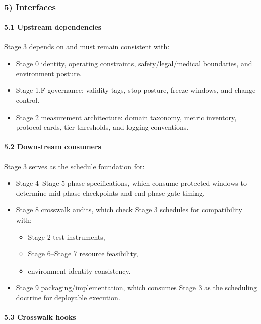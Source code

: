 \documentclass[10pt]{article}
\begin{document}
\subsubsection*{5) Interfaces}

\paragraph*{5.1 Upstream dependencies}

Stage 3 depends on and must remain consistent with:

\begin{itemize}
\item Stage 0 identity, operating constraints, safety/legal/medical boundaries, and environment posture.
\item Stage 1.F governance: validity tags, stop posture, freeze windows, and change control.
\item Stage 2 measurement architecture: domain taxonomy, metric inventory, protocol cards, tier thresholds, and logging conventions.
\end{itemize}

\paragraph*{5.2 Downstream consumers}

Stage 3 serves as the schedule foundation for:

\begin{itemize}
\item Stage 4–Stage 5 phase specifications, which consume protected windows to determine mid-phase checkpoints and end-phase gate timing.
\item Stage 8 crosswalk audits, which check Stage 3 schedules for compatibility with:
  \begin{itemize}
  \item Stage 2 test instruments,
  \item Stage 6–Stage 7 resource feasibility,
  \item environment identity consistency.
  \end{itemize}
\item Stage 9 packaging/implementation, which consumes Stage 3 as the scheduling doctrine for deployable execution.
\end{itemize}

\paragraph*{5.3 Crosswalk hooks}
\end{document}
